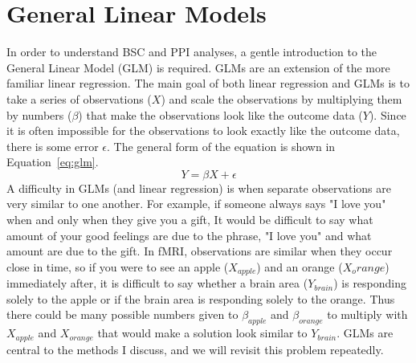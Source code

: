 \documentclass[phd,appendix,figures]{uithesis}
\begin{document}
\section{General Linear Models}
In order to understand BSC and PPI analyses, a gentle introduction to the
General Linear Model (GLM) is required.
GLMs are an extension of the more familiar linear regression.
The main goal of both linear regression and GLMs is to take
a series of observations ($X$) and scale the observations by
multiplying them by numbers ($\beta$) that make the observations
look like the outcome data ($Y$).
Since it is often impossible for the observations to look exactly like
the outcome data, there is some error $\epsilon$.
The general form of the equation is shown in Equation~\ref{eq:glm}.
\begin{equation}
  Y = \beta X + \epsilon
  \label{eq:glm}
\end{equation}
A difficulty in GLMs (and linear regression) is when separate observations are very similar to one another.
For example, if someone always says "I love you" when and only when they give you a gift,
It would be difficult to say what amount of your good feelings are due to the phrase,
"I love you" and what amount are due to the gift.
In fMRI, observations are similar when they occur close in time, so if you were to see
an apple ($X_{apple}$) and an orange ($X_orange$) immediately after, it is difficult to say whether
a brain area ($Y_{brain}$) is responding solely to the apple or if the brain area is responding solely to the orange.
Thus there could be many possible numbers given to $\beta_{apple}$ and $\beta_{orange}$
to multiply with $X_{apple}$ and $X_{orange}$ that would make a solution look similar to
$Y_{brain}$.
GLMs are central to the methods I discuss, and we will revisit this problem repeatedly.
\end{document}
